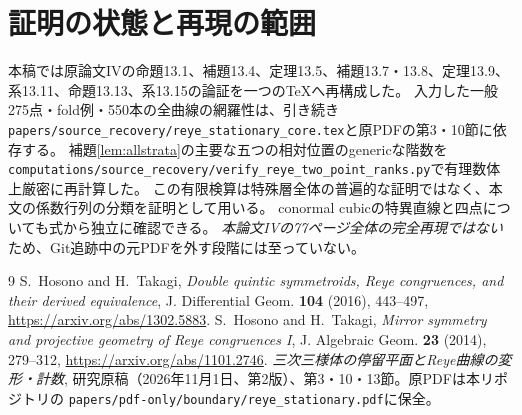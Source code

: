 \documentclass[11pt,a4paper]{ltjsarticle}
\begin{document}
\section{証明の状態と再現の範囲}\label{sec:verification}
本稿では原論文IVの命題13.1、補題13.4、定理13.5、補題13.7・13.8、定理13.9、
系13.11、命題13.13、系13.15の論証を一つのTeXへ再構成した。
入力した一般275点・fold例・550本の全曲線の網羅性は、引き続き
\texttt{papers/source\_recovery/reye\_stationary\_core.tex}と原PDFの第3・10節に依存する。
補題\ref{lem:allstrata}の主要な五つの相対位置のgenericな階数を
\texttt{computations/source\_recovery/verify\_reye\_two\_point\_ranks.py}で有理数体上厳密に再計算した。
この有限検算は特殊層全体の普遍的な証明ではなく、本文の係数行列の分類を証明として用いる。
conormal cubicの特異直線と四点についても式から独立に確認できる。
\emph{本論文IVの77ページ全体の完全再現ではない}ため、Git追跡中の元PDFを外す段階には至っていない。

\begin{thebibliography}{9}\small
{} S.~Hosono and H.~Takagi,
\textit{Double quintic symmetroids, Reye congruences, and their derived equivalence},
J. Differential Geom. \textbf{104} (2016), 443--497,
\url{https://arxiv.org/abs/1302.5883}.
 S.~Hosono and H.~Takagi,
\textit{Mirror symmetry and projective geometry of Reye congruences I},
J. Algebraic Geom. \textbf{23} (2014), 279--312,
\url{https://arxiv.org/abs/1101.2746}.
 \textit{三次三様体の停留平面とReye曲線の変形・計数},
研究原稿（2026年11月1日、第2版）、第3・10・13節。原PDFは本リポジトリの
\texttt{papers/pdf-only/boundary/reye\_stationary.pdf}に保全。
\end{thebibliography}
\end{document}
